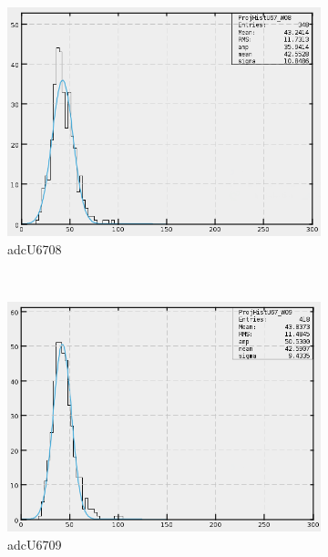 \begin{figure}[h]
\begin{subfigure}[h]{0.3\textwidth}
        \includegraphics[width=\textwidth, keepaspectratio = true]{adcU67_08}
        \caption{adcU6708}
        \label{fig:adcU67_08}
    \end{subfigure}
    ~
    \begin{subfigure}[h]{0.3\textwidth}
        \centering
        \includegraphics[width=\textwidth, keepaspectratio = true]{adcU67_09}
        \caption{adcU6709}
        \label{fig:adcU67_09}
    \end{subfigure}
    ~
    \begin{subfigure}[h]{0.3\textwidth}
        \centering

\end{subfigure}
\end{figure}
